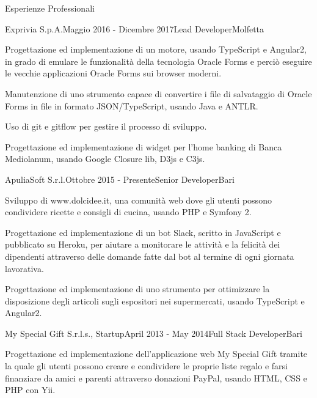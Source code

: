 \documentclass{resume} %
\begin{document}
\begin{rSection}{Esperienze Professionali}
\begin{rSubsection}{Exprivia S.p.A.}{Maggio 2016 - Dicembre 2017}{Lead Developer}{Molfetta}
\item Progettazione ed implementazione di un motore, usando TypeScript e Angular2,
in grado di emulare le funzionalit\`a della tecnologia Oracle Forms e perci\`o eseguire le vecchie applicazioni Oracle Forms sui browser moderni.
\item Manutenzione di uno strumento capace di convertire i file di salvataggio di Oracle Forms in file in formato JSON/TypeScript, usando Java e ANTLR.
\item Uso di git e gitflow per gestire il processo di sviluppo.
\item Progettazione ed implementazione di widget per l'home banking di Banca Mediolanum, usando Google Closure lib, D3js e C3js.
\end{rSubsection}


\begin{rSubsection}{ApuliaSoft S.r.l.}{Ottobre 2015 - Presente}{Senior Developer}{Bari}
\item Sviluppo di www.dolcidee.it, una comunit\`a web dove gli utenti possono condividere ricette e consigli di cucina, usando PHP e Symfony 2.
\item Progettazione ed implementazione di un bot Slack, scritto in JavaScript e pubblicato su Heroku, per aiutare a monitorare le attivit\`a e
la felicit\`a dei dipendenti attraverso delle domande fatte dal bot al termine di ogni giornata lavorativa.
\item Progettazione ed implementazione di uno strumento per ottimizzare la disposizione degli articoli sugli espositori nei supermercati, usando TypeScript e Angular2.
\end{rSubsection}


\begin{rSubsection}{My Special Gift S.r.l.s., Startup}{April 2013 - May 2014}{Full Stack Developer}{Bari}
\item Progettazione ed implementazione dell'applicazione web My Special Gift tramite la quale gli utenti possono creare e condividere le proprie liste regalo e farsi finanziare da amici e parenti attraverso donazioni PayPal, usando HTML, CSS e PHP con Yii.
\end{rSubsection}



\end{rSection}
\end{document}
